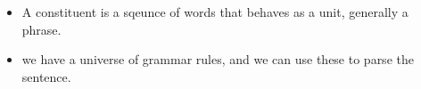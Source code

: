 \documentclass[11pt]{article}
\begin{document}
\begin{minipage}[l]{.5\linewidth}
    \begin{figure}[H]
        \centering
    \end{figure}    
\end{minipage}\hfill
\begin{minipage}[r]{.48\linewidth}
    \begin{itemize}
        \item A constituent is a sqeunce of words that behaves as a unit, generally a phrase.
    \end{itemize}
\end{minipage}

\begin{minipage}[l]{.5\linewidth}
    \begin{figure}[H]
        \centering
    \end{figure}    
\end{minipage}\hfill
\begin{minipage}[r]{.48\linewidth}
    \begin{itemize}
        \item we have a universe of grammar rules, and we can use these to parse the sentence. 
    \end{itemize}
\end{minipage}
\end{document}
